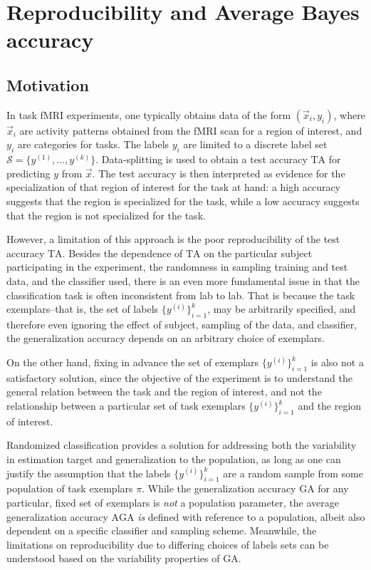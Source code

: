 \section{Reproducibility and Average Bayes accuracy}\label{sec:average_bayes_accuracy}

\subsection{Motivation}

In task fMRI experiments, one typically obtains data of the form
$(\vec{x}_i, y_i)$, where $\vec{x}_i$ are activity patterns obtained
from the fMRI scan for a region of interest, and $y_i$ are categories
for tasks.  The labels $y_i$ are limited to a discrete label set
$\mathcal{S} = \{y^{(1)},\hdots, y^{(k)}\}$.  Data-splitting is used
to obtain a test accuracy $\text{TA}$ for predicting $y$ from
$\vec{x}$.  The test accuracy is then interpreted as evidence for the
specialization of that region of interest for the task at hand: a high
accuracy suggests that the region is specialized for the task, while a
low accuracy suggests that the region is not specialized for the task.

However, a limitation of this approach is the poor reproducibility of
the test accuracy $\text{TA}$.  Besides the dependence of $\text{TA}$
on the particular subject participating in the experiment, the
randomness in sampling training and test data, and the classifier
used, there is an even more fundamental issue in that the
classification task is often inconsistent from lab to lab.  That is
because the task exemplars--that is, the set of labels
$\{y^{(i)}\}_{i=1}^k$, may be arbitrarily specified, and therefore
even ignoring the effect of subject, sampling of the data, and
classifier, the generalization accuracy depends on an arbitrary choice
of exemplars.

On the other hand, fixing in advance the set of exemplars
$\{y^{(i)}\}_{i=1}^k$ is also not a satisfactory solution, since the
objective of the experiment is to understand the general relation
between the task and the region of interest, and not the relationship
between a particular set of task exemplars $\{y^{(i)}\}_{i=1}^k$ and
the region of interest.

Randomized classification provides a solution for addressing both the
variability in estimation target and generalization to the population,
as long as one can justify the assumption that the labels
$\{y^{(i)}\}_{i=1}^k$ are a random sample from some population of task
exemplars $\pi$.  While the generalization accuracy $\text{GA}$ for
any particular, fixed set of exemplars is \emph{not} a population
parameter, the average generalization accuracy $\text{AGA}$ \emph{is}
defined with reference to a population, albeit also dependent on a
specific classifier and sampling scheme.  Meanwhile, the limitations
on reproducibility due to differing choices of labels sets can be
understood based on the variability properties of $\text{GA}$.

